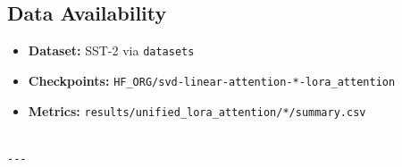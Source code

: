 \subsection{Data Availability}

\begin{itemize}
\item \textbf{Dataset:} SST-2 via \texttt{datasets}
\item \textbf{Checkpoints:} \texttt{{{HF\_ORG}}/svd-linear-attention-*-lora\_attention}
\item \textbf{Metrics:} \texttt{results/unified\_lora\_attention/*/summary.csv}
\end{itemize}
\begin{lstlisting}

---
\end{lstlisting}